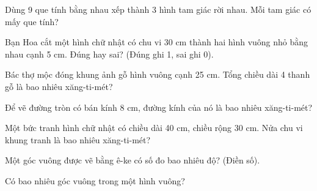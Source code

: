 \begin{ex}
Dùng 9 que tính bằng nhau xếp thành 3 hình tam giác rời nhau. Mỗi tam giác có mấy que tính?
\end{ex}

\begin{ex}
Bạn Hoa cắt một hình chữ nhật có chu vi 30 cm thành hai hình vuông nhỏ bằng nhau cạnh 5 cm. Đúng hay sai? (Đúng ghi 1, sai ghi 0).
\end{ex}

\begin{ex}
Bác thợ mộc đóng khung ảnh gỗ hình vuông cạnh 25 cm. Tổng chiều dài 4 thanh gỗ là bao nhiêu xăng-ti-mét?
\end{ex}

\begin{ex}
Để vẽ đường tròn có bán kính 8 cm, đường kính của nó là bao nhiêu xăng-ti-mét?
\end{ex}

\begin{ex}
Một bức tranh hình chữ nhật có chiều dài 40 cm, chiều rộng 30 cm. Nửa chu vi khung tranh là bao nhiêu xăng-ti-mét?
\end{ex}

\begin{ex}
Một góc vuông được vẽ bằng ê-ke có số đo bao nhiêu độ? (Điền số).
\end{ex}

\begin{ex}
Có bao nhiêu góc vuông trong một hình vuông?
\end{ex}
